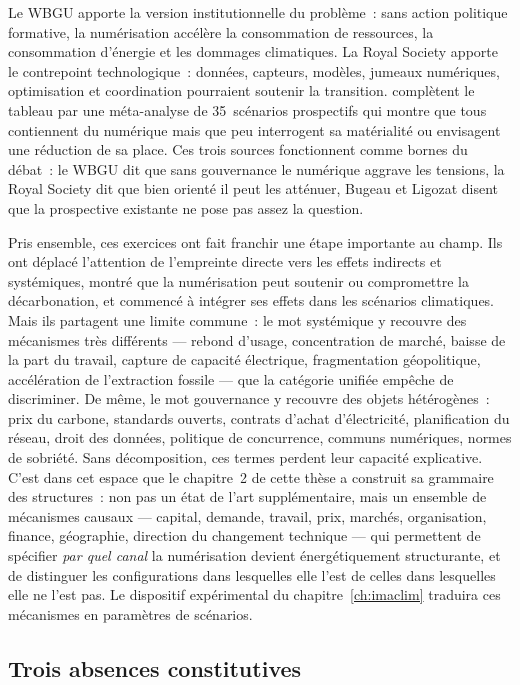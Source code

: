 Le WBGU \parencite*{wbgu_digital_2019} apporte la version institutionnelle du problème~: sans action politique formative, la numérisation accélère la consommation de ressources, la consommation d'énergie et les dommages climatiques. La Royal Society \parencite*{royalsociety_digital_2020} apporte le contrepoint technologique~: données, capteurs, modèles, jumeaux numériques, optimisation et coordination pourraient soutenir la transition. \textcite{bugeau_digital_2024} complètent le tableau par une méta-analyse de 35~scénarios prospectifs qui montre que tous contiennent du numérique mais que peu interrogent sa matérialité ou envisagent une réduction de sa place. Ces trois sources fonctionnent comme bornes du débat~: le WBGU dit que sans gouvernance le numérique aggrave les tensions, la Royal Society dit que bien orienté il peut les atténuer, Bugeau et Ligozat disent que la prospective existante ne pose pas assez la question.

Pris ensemble, ces exercices ont fait franchir une étape importante au champ. Ils ont déplacé l'attention de l'empreinte directe vers les effets indirects et systémiques, montré que la numérisation peut soutenir ou compromettre la décarbonation, et commencé à intégrer ses effets dans les scénarios climatiques. Mais ils partagent une limite commune~: le mot \og systémique\fg{} y recouvre des mécanismes très différents --- rebond d'usage, concentration de marché, baisse de la part du travail, capture de capacité électrique, fragmentation géopolitique, accélération de l'extraction fossile --- que la catégorie unifiée empêche de discriminer. De même, le mot \og gouvernance\fg{} y recouvre des objets hétérogènes~: prix du carbone, standards ouverts, contrats d'achat d'électricité, planification du réseau, droit des données, politique de concurrence, communs numériques, normes de sobriété. Sans décomposition, ces termes perdent leur capacité explicative. C'est dans cet espace que le chapitre~2 de cette thèse a construit sa grammaire des structures~: non pas un état de l'art supplémentaire, mais un ensemble de mécanismes causaux --- capital, demande, travail, prix, marchés, organisation, finance, géographie, direction du changement technique --- qui permettent de spécifier \emph{par quel canal} la numérisation devient énergétiquement structurante, et de distinguer les configurations dans lesquelles elle l'est de celles dans lesquelles elle ne l'est pas. Le dispositif expérimental du chapitre~\ref{ch:imaclim} traduira ces mécanismes en paramètres de scénarios.


\subsection{Trois absences constitutives}\label{subsec:vide}

